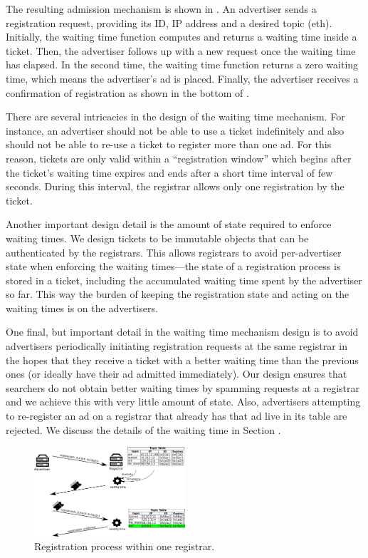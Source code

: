 The resulting admission mechanism is shown in . An advertiser sends a registration request, providing its ID, IP address and a desired topic (eth). Initially, the waiting time function computes and returns a waiting time inside a ticket. Then, the advertiser follows up with a new request once the waiting time has elapsed. In the second time, the waiting time function returns a zero waiting time, which means the advertiser's ad is placed. Finally, the advertiser receives a confirmation of registration as shown in the bottom of . 

There are several intricacies in the design of the waiting time mechanism. For instance, an advertiser should not be able to use a ticket indefinitely and also should not be able to re-use a ticket to register more than one ad. For this reason, tickets are only valid within a ``registration window'' which begins after the ticket's waiting time expires and ends after a short time interval of few seconds. During this interval, the registrar allows only one registration by the ticket. 

Another important design detail is the amount of state required to enforce waiting times. We design tickets to be immutable objects that can be authenticated by the registrars. This allows registrars to avoid per-advertiser state when enforcing the waiting times---the state of a registration process is stored in a ticket, including the accumulated waiting time spent by the advertiser so far. This way the burden of keeping the registration state and acting on the waiting times is on the advertisers. 

One final, but important detail in the waiting time mechanism design is to avoid advertisers periodically initiating registration requests at the same registrar in the hopes that they receive a ticket with a better waiting time than the previous ones (or ideally have their ad admitted immediately). Our design ensures that searchers do not obtain better waiting times by spamming requests at a registrar and we achieve this with very little amount of state. Also, advertisers attempting to re-register an ad on a registrar that already has that ad live in its table are rejected. We discuss the details of the waiting time in Section .

\begin{figure}
    \includegraphics[width=0.5\textwidth]{img/registration}
    \caption{Registration process within one registrar.}
    \label{fig:registration}
\end{figure}

